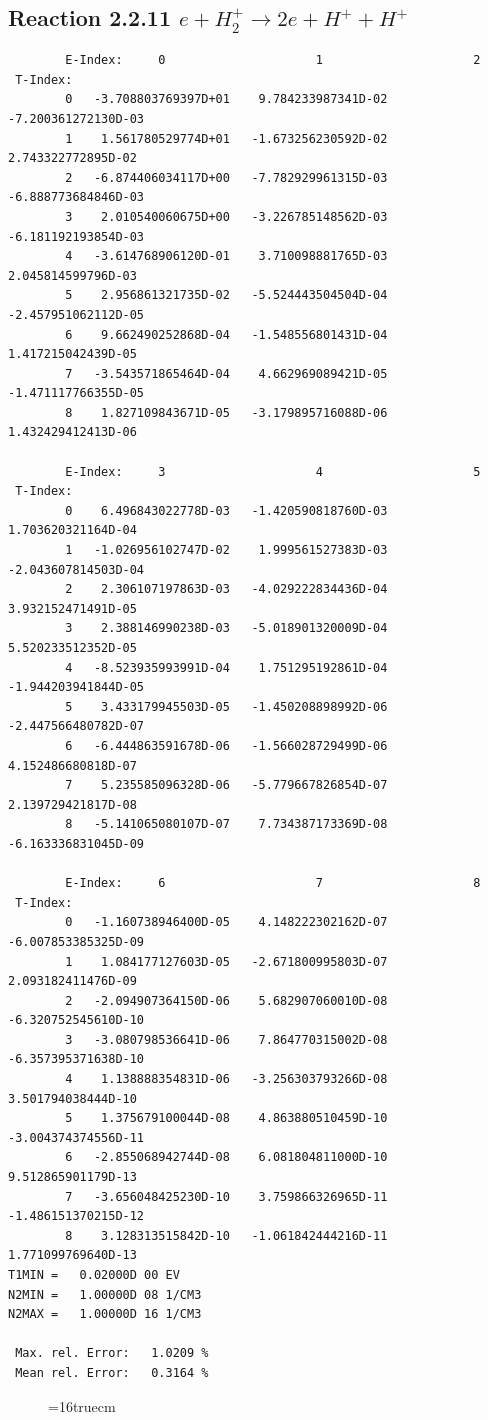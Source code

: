 \documentclass[12pt,dvipdfmx]{article}
\begin{document}
\subsection{
Reaction 2.2.11   $e + H_2^+      \rightarrow 2e + H^+ + H^+ $
}


\begin{small}\begin{verbatim}
        E-Index:     0                     1                     2
 T-Index:
        0   -3.708803769397D+01    9.784233987341D-02   -7.200361272130D-03
        1    1.561780529774D+01   -1.673256230592D-02    2.743322772895D-02
        2   -6.874406034117D+00   -7.782929961315D-03   -6.888773684846D-03
        3    2.010540060675D+00   -3.226785148562D-03   -6.181192193854D-03
        4   -3.614768906120D-01    3.710098881765D-03    2.045814599796D-03
        5    2.956861321735D-02   -5.524443504504D-04   -2.457951062112D-05
        6    9.662490252868D-04   -1.548556801431D-04    1.417215042439D-05
        7   -3.543571865464D-04    4.662969089421D-05   -1.471117766355D-05
        8    1.827109843671D-05   -3.179895716088D-06    1.432429412413D-06

        E-Index:     3                     4                     5
 T-Index:
        0    6.496843022778D-03   -1.420590818760D-03    1.703620321164D-04
        1   -1.026956102747D-02    1.999561527383D-03   -2.043607814503D-04
        2    2.306107197863D-03   -4.029222834436D-04    3.932152471491D-05
        3    2.388146990238D-03   -5.018901320009D-04    5.520233512352D-05
        4   -8.523935993991D-04    1.751295192861D-04   -1.944203941844D-05
        5    3.433179945503D-05   -1.450208898992D-06   -2.447566480782D-07
        6   -6.444863591678D-06   -1.566028729499D-06    4.152486680818D-07
        7    5.235585096328D-06   -5.779667826854D-07    2.139729421817D-08
        8   -5.141065080107D-07    7.734387173369D-08   -6.163336831045D-09

        E-Index:     6                     7                     8
 T-Index:
        0   -1.160738946400D-05    4.148222302162D-07   -6.007853385325D-09
        1    1.084177127603D-05   -2.671800995803D-07    2.093182411476D-09
        2   -2.094907364150D-06    5.682907060010D-08   -6.320752545610D-10
        3   -3.080798536641D-06    7.864770315002D-08   -6.357395371638D-10
        4    1.138888354831D-06   -3.256303793266D-08    3.501794038444D-10
        5    1.375679100044D-08    4.863880510459D-10   -3.004374374556D-11
        6   -2.855068942744D-08    6.081804811000D-10    9.512865901179D-13
        7   -3.656048425230D-10    3.759866326965D-11   -1.486151370215D-12
        8    3.128313515842D-10   -1.061842444216D-11    1.771099769640D-13
T1MIN =   0.02000D 00 EV
N2MIN =   1.00000D 08 1/CM3
N2MAX =   1.00000D 16 1/CM3

 Max. rel. Error:   1.0209 %
 Mean rel. Error:   0.3164 %

\end{verbatim}\end{small}
\begin{figure} \label{2.2.11}
\epsfxsize=16truecm
\end{figure}
\newpage
\end{document}
